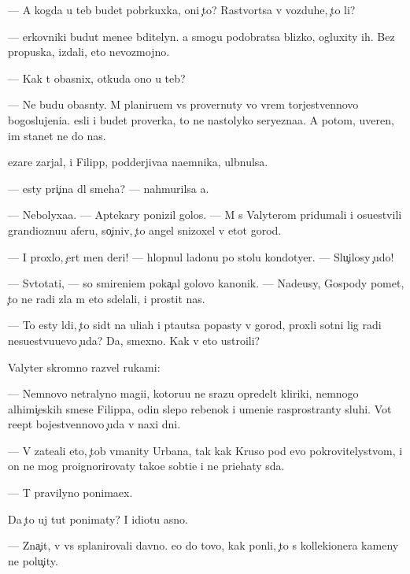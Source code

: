 \documentclass[10pt]{book}
\begin{document}
— A kogda u teb{\ia} budet pobr{\ia}kuxka, oni {\c}to? Rastvor{\ia}tsa v vozduhe, {\c}to li?

— {\Q}erkovniki budut mene{\y}e bditelyn{\yi}. {\Y}a smogu podobratsa blizko, ogluxity ih. Bez propuska, izdali, eto nevozmojno.

— Kak t{\yi} ob{\y}asnix, otkuda ono u teb{\ia}?

— Ne budu ob{\y}asn{\ia}ty. M{\yi} planiru{\y}em vs{\e} provernuty vo vrem{\ia} torjestvennovo bogoslujeni{\y}a. {\Y}esli i budet proverka, to ne nastolyko seryezna{\y}a. A potom, uveren, im stanet ne do nas.

{\C}ezare zarjal, i Filipp, podderjiva{\y}a na{\y}emnika, ul{\yi}bnulsa.

— {\Y}esty pri{\c}ina dl{\ia} smeha? — nahmurilsa {\y}a.

— Nebolyxa{\y}a. — Aptekary ponizil golos. — M{\yi} s Valyterom pridumali i osu{\x}estvili grandioznu{\y}u aferu, so{\c}iniv, {\c}to angel snizoxel v etot gorod.

— I proxlo, {\c}ert men{\ia} deri! — hlopnul ladon{\y}u po stolu kondotyer. — Slu{\c}ilosy {\c}udo!

— Sv{\ia}totat{\q}i, — so smireni{\y}em poka{\c}al golovo{\y} kanonik. — Nade{\y}usy, Gospody po{\y}met, {\c}to ne radi zla m{\yi} eto sdelali, i prostit nas.

— To {\y}esty l{\iu}di, {\c}to sid{\ia}t na uli{\q}ah i p{\yi}ta{\y}utsa popasty v gorod, proxli sotni lig radi nesu{\x}estvu{\y}u{\x}evo {\c}uda? Da, smexno. Kak v{\yi} eto ustro{\y}ili?

Valyter skromno razvel rukami:

— Nemnovo ne{\y}tralyno{\y} magi{\y}i, kotoru{\y}u ne srazu opredel{\ia}t kliriki, nemnogo alhimi{\c}eskih smese{\y} Filippa, odin slepo{\y} rebenok i umeni{\y}e rasprostran{\ia}ty sluhi. Vot re{\q}ept bojestvennovo {\c}uda v naxi dni.

— V{\yi} zate{\y}ali eto, {\c}tob{\yi} v{\yi}manity Urbana, tak kak Kruso pod {\y}evo pokrovitelystvom, i on ne mog pro{\y}ignorirovaty tako{\y}e sob{\yi}ti{\y}e i ne pri{\y}ehaty s{\iu}da.

— T{\yi} pravilyno ponima{\y}ex.

Da {\c}to uj tut ponimaty? I idiotu {\y}asno.

— Zna{\c}it, v{\yi} vs{\e} splanirovali davno. {\y}e{\x}o do tovo, kak pon{\ia}li, {\c}to s kollek{\q}ionera kameny ne polu{\c}ity.
\end{document}
